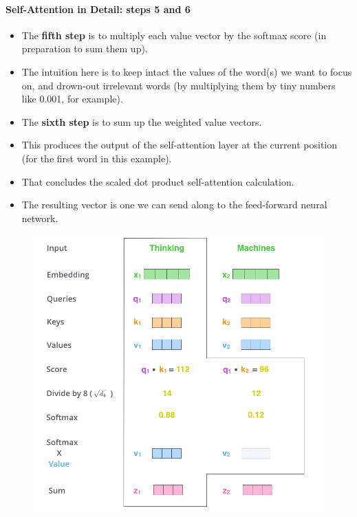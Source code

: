 \paragraph{Self-Attention in Detail: steps 5 and 6}
\begin{itemize}
\item The \textbf{fifth step} is to multiply each value vector by the softmax score (in preparation to sum them up).

\item The intuition here is to keep intact the values of the word(s) we want to focus on, and drown-out irrelevant words (by multiplying them by tiny numbers like 0.001, for example).

\item The \textbf{sixth step} is to sum up the weighted value vectors.

\item This produces the output of the self-attention layer at the current position (for the first word in this example).

\item That concludes the scaled dot product self-attention calculation.

\item The resulting vector is one we can send along to the feed-forward neural network.


\end{itemize}


\begin{figure}[h]
        	\includegraphics[scale = 0.3]{pics/self-attention-output.png}
        \end{figure} 



